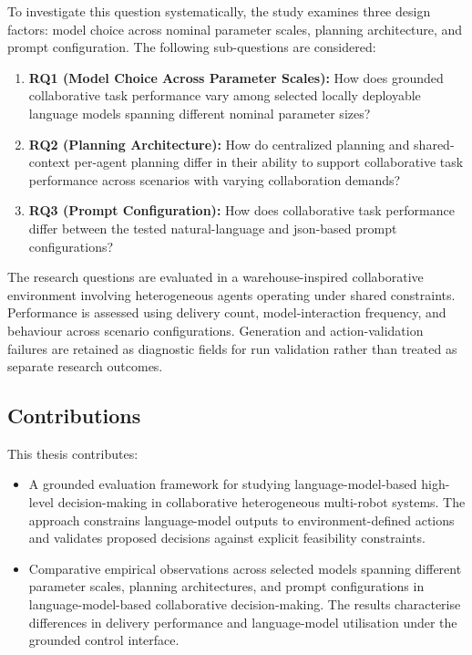 To investigate this question systematically, the study examines three design factors: model choice across nominal parameter scales, planning architecture, and prompt configuration. The following sub-questions are considered:

\begin{enumerate}
\item \textbf{RQ1 (Model Choice Across Parameter Scales):} How does grounded collaborative task performance vary among selected locally deployable language models spanning different nominal parameter sizes?

\item \textbf{RQ2 (Planning Architecture):} How do centralized planning and shared-context per-agent planning differ in their ability to support collaborative task performance across scenarios with varying collaboration demands?

\item \textbf{RQ3 (Prompt Configuration):} How does collaborative task performance differ between the tested natural-language and \gls{json}-based prompt configurations?
\end{enumerate}

The research questions are evaluated in a warehouse-inspired collaborative environment involving heterogeneous agents operating under shared constraints. Performance is assessed using delivery count, model-interaction frequency, and behaviour across scenario configurations. Generation and action-validation failures are retained as diagnostic fields for run validation rather than treated as separate research outcomes.

\subsection{Contributions}
\label{sec:contrib}

This thesis contributes:

\begin{itemize}
\item A grounded evaluation framework for studying language-model-based high-level decision-making in collaborative heterogeneous multi-robot systems. The approach constrains language-model outputs to environment-defined actions and validates proposed decisions against explicit feasibility constraints.

\item Comparative empirical observations across selected models spanning different parameter scales, planning architectures, and prompt configurations in language-model-based collaborative decision-making. The results characterise differences in delivery performance and language-model utilisation under the grounded control interface.
\end{itemize}


